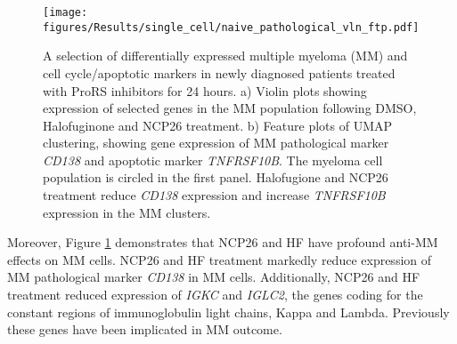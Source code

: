 %
\begin{figure}[htb]
\centering
\texttt{[image: figures/Results/single\_cell/naive\_pathological\_vln\_ftp.pdf]}
\caption[scRNA-seq differentially expressed MM markers- newly diagnosed patients]{A selection of differentially expressed multiple myeloma (MM) and cell cycle/apoptotic markers in newly diagnosed patients treated with ProRS inhibitors for 24 hours.
    a) Violin plots showing expression of selected genes in the MM population following DMSO, Halofuginone and NCP26 treatment.
    b) Feature plots of UMAP clustering, showing gene expression of MM pathological marker \textit{CD138} and apoptotic marker \textit{TNFRSF10B}.
The myeloma cell population is circled in the first panel.
Halofugione and NCP26 treatment reduce \textit{CD138} expression and increase \textit{TNFRSF10B} expression in the MM clusters.}
\label{fig:naive_path_vln_ftp}
\end{figure}

Moreover, Figure \ref{fig:naive_path_vln_ftp} demonstrates that NCP26 and HF have profound anti-MM effects on MM cells.
NCP26 and HF treatment markedly reduce expression of MM pathological marker \textit{CD138} in MM cells.
Additionally, NCP26 and HF treatment reduced expression of \textit{IGKC} and \textit{IGLC2}, the genes coding for the constant regions of immunoglobulin light chains, Kappa and Lambda.
Previously these genes have been implicated in MM outcome.


\clearpage
